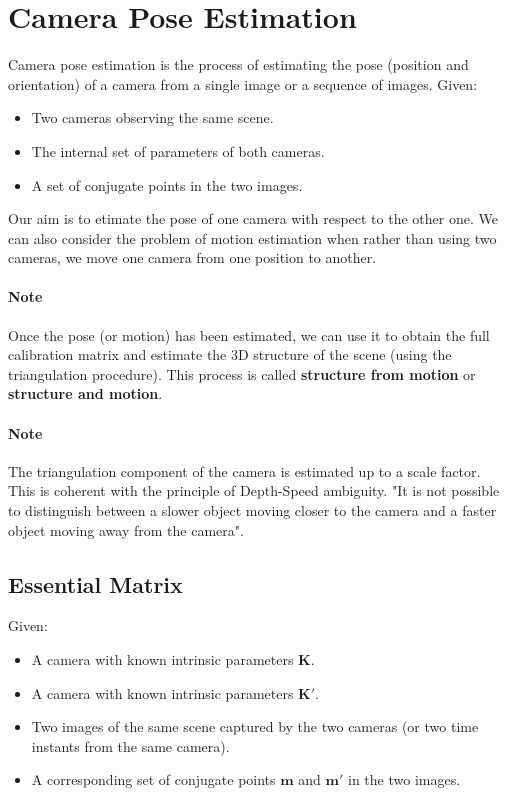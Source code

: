 \documentclass[11pt,a4paper]{article}
\theoremstyle{definition}
\theoremstyle{plain}
\theoremstyle{remark}
\begin{document}
\section{Camera Pose Estimation}

Camera pose estimation is the process of estimating the pose (position and orientation) 
of a camera from a single image or a sequence of images.
Given:
\begin{itemize}
    \item Two cameras observing the same scene.
    \item The internal set of parameters of both cameras.
    \item A set of conjugate points in the two images.
\end{itemize}
Our aim is to etimate the pose of one camera with respect to the other one.
We can also consider the problem of motion estimation when rather than using two cameras,
we move one camera from one position to another.

\paragraph{Note}
Once the pose (or motion) has been estimated, we can use it to obtain the full calibration matrix
and estimate the 3D structure of the scene (using the triangulation procedure).
This process is called \textbf{structure from motion} or \textbf{structure and motion}.

\paragraph{Note}
The triangulation component of the camera is estimated up to a scale factor.
This is coherent with the principle of Depth-Speed ambiguity.
"It is not possible to distinguish between a slower object moving closer
to the camera and a faster object moving away from the camera".

\subsection{Essential Matrix}\label{subsec:essential_matrix}

Given:
\begin{itemize}
    \item A camera with known intrinsic parameters $\mathbf{K}$.
    \item A camera with known intrinsic parameters $\mathbf{K}'$.
    \item Two images of the same scene captured by the two cameras (or two time instants from the same camera).
    \item A corresponding set of conjugate points $\mathbf{m}$ and $\mathbf{m}'$ in the two images.
\end{itemize}
\end{document}
